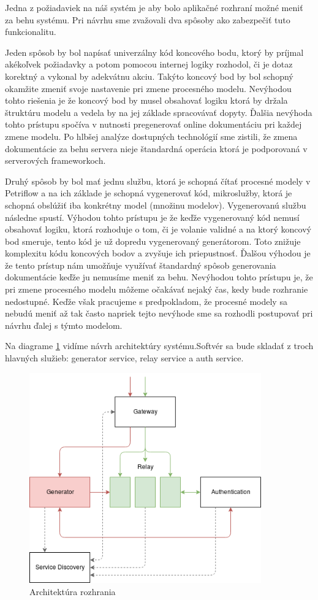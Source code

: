 Jedna z požiadaviek na náš systém je aby bolo aplikačné rozhraní možné meniť za behu systému. Pri návrhu sme zvažovali dva spôsoby ako zabezpečiť tuto funkcionalitu.

Jeden spôsob by bol napísať univerzálny kód koncového bodu, ktorý by príjmal akékoľvek požiadavky a potom pomocou internej logiky rozhodol, či je dotaz korektný a vykonal by adekvátnu akciu.  Takýto koncový bod by bol schopný okamžite zmeniť svoje nastavenie pri zmene procesného modelu. Nevýhodou tohto riešenia je že koncový bod by musel obsahovať logiku ktorá by držala štruktúru modelu a vedela by na jej základe spracovávať dopyty. Ďalšia nevýhoda tohto prístupu spočíva v nutnosti pregenerovať online dokumentáciu pri každej zmene modelu. Po hlbšej analýze dostupných technológií sme zistili, že zmena dokumentácie za behu servera nieje štandardná operácia ktorá je podporovaná v serverových frameworkoch. 

Druhý spôsob by bol mať jednu službu, ktorá je schopná čítať procesné modely v Petriflow a na ich základe je schopná vygenerovať kód, mikroslužby, ktorá je schopná obslúžiť iba konkrétny model (množinu modelov).  Vygenerovanú službu následne spustí.
Výhodou tohto prístupu je že keďže vygenerovaný kód nemusí obsahovať logiku, ktorá rozhoduje o tom, či je volanie validné a na ktorý koncový bod smeruje, tento kód je už dopredu vygenerovaný generátorom. Toto znižuje komplexitu kódu koncových bodov a zvyšuje ich priepustnosť. Ďalšou výhodou je že tento prístup nám umožňuje využívať štandardný spôsob generovania dokumentácie keďže ju nemusíme meniť za behu. Nevýhodou tohto prístupu je, že pri zmene procesného modelu môžeme očakávať nejaký čas, kedy bude rozhranie nedostupné. Keďže však pracujeme s predpokladom, že procesné modely sa nebudú meniť až tak často napriek tejto nevýhode sme sa rozhodli postupovať pri návrhu ďalej s týmto modelom. 

Na diagrame \ref{architecture} vidíme návrh architektúry systému.Softvér sa bude skladať z troch hlavných služieb: generator service, relay service a auth service. 
\begin{figure}[!htbp]
	\centering
	\includegraphics[width=10cm]{img/architecture.png}
	\caption{Architektúra rozhrania}
	\label{architecture}
\end{figure}


